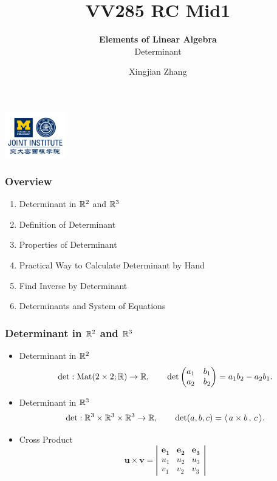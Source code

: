 \documentclass[12pt, t]{beamer}
\title{VV285 RC Mid1}
\subtitle{\textbf{Elements of Linear Algebra}\\\large Determinant}
\institute[UM-SJTU JI]{Univerity of Michigan-Shanghai Jiao Tong University Joint Institute}
\author{Xingjian Zhang}
\newcommand{\scp}[2]{\langle\,#1\,,\,#2\,\rangle} \newcommand{\scpp}{\langle\,\cdot\,,\,\cdot\,\rangle}
\begin{document}
\begin{frame}
    \titlepage
    \begin{center}
        \includegraphics[height=2cm]{logo2.png}
    \end{center}
\end{frame}

\begin{frame}
    \frametitle{Overview}

    \begin{enumerate}
        \item Determinant in $\mathbb{R}^2$ and $\mathbb{R}^3$
        \item Definition of Determinant
        \item Properties of Determinant
        \item Practical Way to Calculate Determinant by Hand
        \item Find Inverse by Determinant
        \item Determinants and System of Equations
    \end{enumerate}

\end{frame}

\begin{frame}
    \frametitle{Determinant in $\mathbb{R}^2$ and $\mathbb{R}^3$}
    \begin{itemize}
        \item Determinant in $\mathbb{R}^2$
              \begin{equation}\label{eq27}
                  \det:\text{Mat}(2\times 2;\mathbb{R})\to\mathbb{R},\qquad\det\begin{pmatrix}
                      a_1 & b_1 \\
                      a_2 & b_2
                  \end{pmatrix}=a_1b_2-a_2b_1.
              \end{equation}
        \item Determinant in $\mathbb{R}^3$
              \begin{equation}\label{eq28}
                  \det:\R^3\times\R^3\times\R^3\to\R,\qquad\det(a,b,c)=\scp{a\times b}{c}.
              \end{equation}
        \item Cross Product
              \begin{equation}\mathbf{u} \times \mathbf{v}=\left|\begin{array}{ccc}
                      \mathbf{e_1} & \mathbf{e_2} & \mathbf{e_3} \\
                      u_{1}        & u_{2}        & u_{3}        \\
                      v_{1}        & v_{2}        & v_{3}
                  \end{array}\right|\end{equation}
    \end{itemize}
\end{frame}
\end{document}
